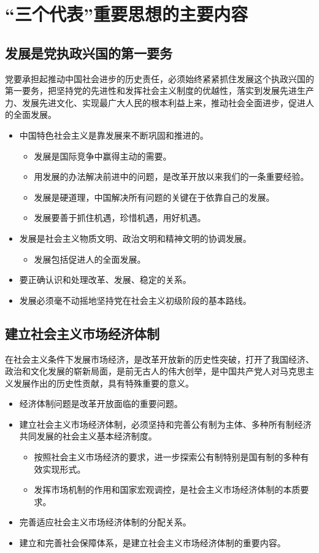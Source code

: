 \documentclass[12pt,openany]{ctexbook}
\begin{document}
\section{“三个代表”重要思想的主要内容}
\subsection{发展是党执政兴国的第一要务}
党要承担起推动中国社会进步的历史责任，必须始终紧紧抓住发展这个执政兴国的第一要务，把坚持党的先进性和发挥社会主义制度的优越性，落实到发展先进生产力、发展先进文化、实现最广大人民的根本利益上来，推动社会全面进步，促进人的全面发展。
\begin{itemize}
  \item 中国特色社会主义是靠发展来不断巩固和推进的。
\begin{itemize}
  \item 发展是国际竞争中赢得主动的需要。
  \item 用发展的办法解决前进中的问题，是改革开放以来我们的一条重要经验。
  \item 发展是硬道理，中国解决所有问题的关键在于依靠自己的发展。
  \item 发展要善于抓住机遇，珍惜机遇，用好机遇。
\end{itemize}
  \item 发展是社会主义物质文明、政治文明和精神文明的协调发展。
\begin{itemize}
  \item 发展包括促进人的全面发展。
\end{itemize}
  \item 要正确认识和处理改革、发展、稳定的关系。
  \item 发展必须毫不动摇地坚持党在社会主义初级阶段的基本路线。
\end{itemize}
\subsection{建立社会主义市场经济体制}
在社会主义条件下发展市场经济，是改革开放新的历史性突破，打开了我国经济、政治和文化发展的崭新局面，是前无古人的伟大创举，是中国共产党人对马克思主义发展作出的历史性贡献，具有特殊重要的意义。
\begin{itemize}
  \item 经济体制问题是改革开放面临的重要问题。
  \item 建立社会主义市场经济体制，必须坚持和完善公有制为主体、多种所有制经济共同发展的社会主义基本经济制度。
\begin{itemize}
  \item 按照社会主义市场经济的要求，进一步探索公有制特别是国有制的多种有效实现形式。
  \item 发挥市场机制的作用和国家宏观调控，是社会主义市场经济体制的本质要求。
\end{itemize}
  \item 完善适应社会主义市场经济体制的分配关系。
  \item 建立和完善社会保障体系，是建立社会主义市场经济体制的重要内容。
\end{itemize}
\end{document}

